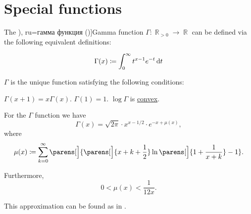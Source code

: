 \section{Special functions}\label{sec:special_functions}

\begin{definition}\label{def:gamma_function}
  The \term[bg=гама (функция) (\cite[280]{Тагамлицки1978Инт}), ru=гамма функция (\cite[406]{Зорич2019АнализТом2})]{Gamma function} \( \Gamma: \BbbR_{>0} \to \BbbR \) can be defined via the following equivalent definitions:
  \begin{thmenum}
    \begin{equation}\label{eq:def:gamma_function/direct}
      \Gamma(x) \coloneqq \int_0^\infty t^{x-1} e^{-t} \dl t
    \end{equation}

     \( \Gamma \) is the unique function satisfying the following conditions:
    \begin{thmenum}
       \( \Gamma(x + 1) = x \Gamma(x) \).
       \( \Gamma(1) = 1 \).
       \( \log \Gamma \) is \hyperref[def:convex_function]{convex}.
    \end{thmenum}
  \end{thmenum}
\end{definition}

\begin{theorem}\label{thm:stirlings_gamma_approximation}
  For the \( \Gamma \) function we have
  \begin{equation}\label{eq:thm:stirlings_gamma_approximation}
    \Gamma(x) = \sqrt{2 \pi} \cdot x^{x - 1 / 2} \cdot e^{-x + \mu(x)},
  \end{equation}
  where
  \begin{equation}\label{eq:thm:stirlings_gamma_approximation/mu}
    \mu(x) \coloneqq \sum_{k=0}^\infty \parens[\Big]{ \parens[\Big]{ x + k + \frac 1 2 } \ln\parens[\Big]{ 1 + \frac 1 {x + k} } - 1 }.
  \end{equation}

  Furthermore,
  \begin{equation}\label{eq:thm:stirlings_gamma_approximation/mu_inequality}
    0 < \mu(x) < \frac 1 {12x}.
  \end{equation}
\end{theorem}
\begin{comments}
  \item This approximation can be found as  in \cite{notebook:code}.
\end{comments}
